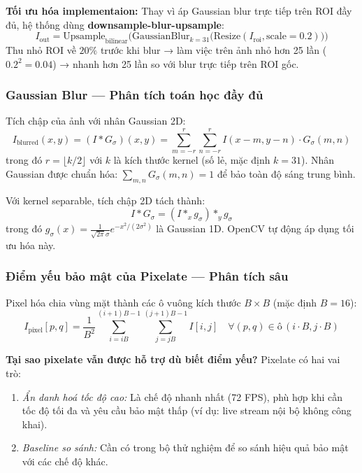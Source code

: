 \textbf{Tối ưu hóa implementaion:} Thay vì áp Gaussian blur trực tiếp trên ROI đầy đủ, hệ thống dùng \textbf{downsample-blur-upsample}:
\begin{equation}
    I_{\text{out}} = \text{Upsample}_{\text{bilinear}}\Big(\text{GaussianBlur}_{k=31}\big(\text{Resize}(I_{\text{roi}}, \text{scale}=0.2)\big)\Big)
\end{equation}
Thu nhỏ ROI về $20\%$ trước khi blur → làm việc trên ảnh nhỏ hơn 25 lần ($0.2^2 = 0.04$) → nhanh hơn 25 lần so với blur trực tiếp trên ROI gốc.

\subsubsection{Gaussian Blur --- Phân tích toán học đầy đủ}
\label{subsubsec:gaussianblur}

Tích chập của ảnh với nhân Gaussian 2D:
\begin{equation}
    I_{\text{blurred}}(x,y) = (I * G_\sigma)(x,y) = \sum_{m=-r}^{r}\sum_{n=-r}^{r} I(x-m, y-n) \cdot G_\sigma(m,n)
\end{equation}
trong đó $r = \lfloor k/2 \rfloor$ với $k$ là kích thước kernel (số lẻ, mặc định $k=31$). Nhân Gaussian được chuẩn hóa: $\sum_{m,n} G_\sigma(m,n) = 1$ để bảo toàn độ sáng trung bình.

\medskip
Với kernel separable, tích chập 2D tách thành:
\begin{equation}
    I * G_\sigma = (I *_x g_\sigma) *_y g_\sigma
\end{equation}
trong đó $g_\sigma(x) = \frac{1}{\sqrt{2\pi}\sigma} e^{-x^2/(2\sigma^2)}$ là Gaussian 1D. OpenCV tự động áp dụng tối ưu hóa này.

\subsubsection{Điểm yếu bảo mật của Pixelate --- Phân tích sâu}
\label{subsubsec:pixelate}

Pixel hóa chia vùng mặt thành các ô vuông kích thước $B \times B$ (mặc định $B = 16$):
\begin{equation}
    I_{\text{pixel}}[p, q] = \frac{1}{B^2} \sum_{i=iB}^{(i+1)B-1} \sum_{j=jB}^{(j+1)B-1} I[i, j] \quad \forall (p,q) \in \text{ô}\,(i \cdot B, j \cdot B)
\end{equation}

\textbf{Tại sao pixelate vẫn được hỗ trợ dù biết điểm yếu?} Pixelate có hai vai trò:
\begin{enumerate}[1.]
    \item \textit{Ẩn danh hoá tốc độ cao:} Là chế độ nhanh nhất (72 FPS), phù hợp khi cần tốc độ tối đa và yêu cầu bảo mật thấp (ví dụ: live stream nội bộ không công khai).
    \item \textit{Baseline so sánh:} Cần có trong bộ thử nghiệm để so sánh hiệu quả bảo mật với các chế độ khác.
\end{enumerate}

